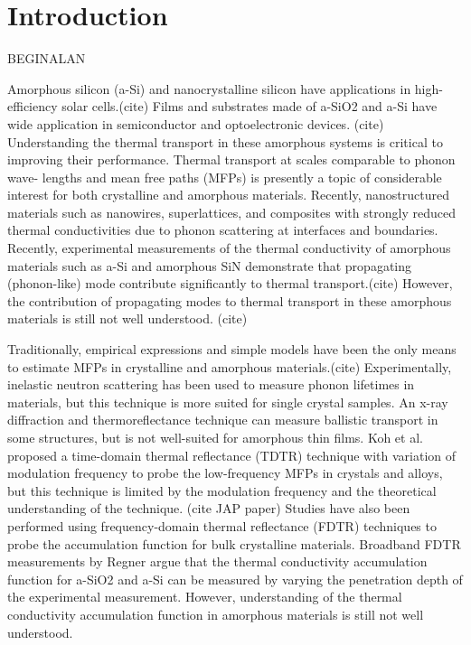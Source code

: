\documentclass[aps,prb,onecolumn,preprint,superscriptaddress,footinbib,amsmath,amssymb,floatfix]{revtex4}
\begin{document}
\section{\label{S:Introduction}Introduction}

BEGINALAN

Amorphous silicon (a-Si) and nanocrystalline silicon have applications 
in high-efficiency solar cells.(cite) 
Films and substrates made of a-SiO2 and a-Si have wide application in 
semiconductor and optoelectronic devices.
(cite) Understanding the thermal transport in these amorphous systems 
is critical to improving their performance. 
Thermal transport at scales comparable to phonon wave-
lengths and mean free paths (MFPs) is presently a topic of
considerable interest for both crystalline and amorphous materials.
\cite{cahill_nanoscale_2003,
yu_reduction_2010,hochbaum_enhanced_2008,pernot_precise_2010}
Recently, nanostructured materials
such as nanowires, superlattices, and composites with
strongly reduced thermal conductivities due to phonon
scattering at interfaces and boundaries.
\cite{hochbaum_enhanced_2008,pernot_precise_2010,
boukai_silicon_2008,poudel_high-thermoelectric_2008} Recently, 
experimental measurements of the thermal conductivity of amorphous 
materials such as a-Si and amorphous SiN demonstrate that 
propagating (phonon-like) mode contribute significantly to thermal 
transport.(cite) However, the contribution of propagating modes to 
thermal 
transport in these amorphous materials is still not well understood.
(cite)

Traditionally, empirical expressions and
simple models have been the only means
to estimate MFPs in crystalline\cite{holland_analysis_1963} 
and amorphous materials.(cite)   
Experimentally, inelastic neutron scattering has been
used to measure phonon lifetimes in materials,
but this technique is more suited for single crystal samples.
\cite{christianson_phonon_2008} 
An x-ray diffraction and thermoreflectance technique
can measure ballistic transport in some structures, but is 
not well-suited for amorphous thin films.
\cite{highland_ballistic-phonon_2007} 
Koh et al. proposed a time-domain thermal reflectance (TDTR) 
technique with variation of
modulation frequency to probe the low-frequency MFPs in 
crystals and alloys,
\cite{koh_frequency_2007} 
but this technique is limited by the modulation frequency 
and the theoretical understanding of the technique.
(cite JAP paper) 
Studies have also been performed using  
frequency-domain thermal reflectance (FDTR) techniques 
to probe the accumulation function for bulk 
crystalline materials.\cite{minnich_thermal_2011,yang_mean_2013} 
Broadband FDTR measurements by Regner argue that the thermal 
conductivity accumulation function for a-SiO2 and a-Si  
can be measured by varying the penetration depth of the 
experimental measurement.\cite{regner_broadband_2013}
However, understanding 
of the thermal conductivity accumulation function in amorphous 
materials is still not well understood.
\cite{feldman_thermal_1993,cahill_thermal_1994,
feldman_numerical_1999,liu_high_2009,yang_anomalously_2010,
he_thermal_2011}
\end{document}
